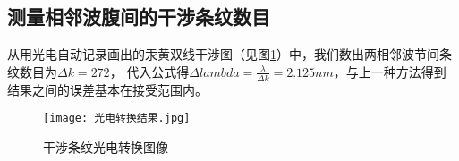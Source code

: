 \documentclass[12pt, a4paper]{ctexart}
\begin{document}
\subsection{测量相邻波腹间的干涉条纹数目}

从用光电自动记录画出的汞黄双线干涉图（见图\ref{fig 2}）中，我们数出两相邻波节间条纹数目为$\Delta k = 272$，
代入公式得$\Delta lambda = \frac{\bar{\lambda}}{\Delta k} = 2.125nm$，与上一种方法得到结果之间的误差基本在接受范围内。

\begin{figure}
    \centering
    \texttt{[image: 光电转换结果.jpg]}
    \caption{干涉条纹光电转换图像}
    \label{fig 2}
\end{figure}
\end{document}
